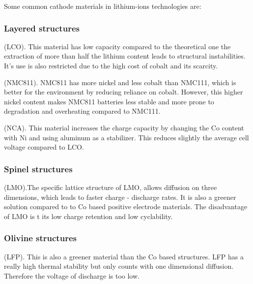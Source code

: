 \documentclass{article}
\begin{document}
Some common cathode materials in lithium-ions technologies are:
\begin{description}
 \subsubsection{Layered structures}
  \item[$\text{LiCoO}_{2}$]  (LCO). This material has low capacity compared to the theoretical one the extraction of more than half the lithium content leads to structural instabilities. It's use is also restricted due to the high cost of cobalt and its scarcity. \cite{topo}\cite{LCO}
 
  \item[$ \text{Li(Ni}_{0.8}\text{Co}_{0.1}\text{Mn}_{0.1}\text{)O}_{2} $]  (NMC811). NMC811 has more nickel and less cobalt than NMC111, which is better for the environment by reducing reliance on cobalt. However, this higher nickel content makes NMC811 batteries less stable and more prone to degradation and overheating compared to NMC111.\cite{topo}
  

  \item[$\text{LiNi}_{0.8}\text{Co}_{0.15}\text{Al}_{0.05}\text{O}_{2}$] (NCA).
  This material increases the charge capacity by changing the Co content with Ni and using aluminum as 
  a stabilizer. This reduces slightly the average cell voltage
  compared to LCO.\cite{topo}
\end{description}

\begin{description}
 \subsubsection{Spinel structures}
  \item[$\text{LiMn}_{2}\text{O}_{4}$](LMO).The specific lattice structure
  of LMO, allows diffusion on three dimensions, which leads to faster charge
  - discharge rates. It is also a greener solution compared to to 
  Co based positive electrode materials. The disadvantage of LMO is t
its low charge retention and low cyclability.\cite{topo}
\end{description}

\begin{description}
  \subsubsection{Olivine structures}
  \item[$\text{LiFePO}_{4}$](LFP). This is also a greener material than the 
  Co based structures. LFP has a really high thermal stability but only counts
  with one dimensional diffusion. Therefore the voltage of discharge
  is too low.\cite{Olivine} \\
\end{description}
\end{document}
